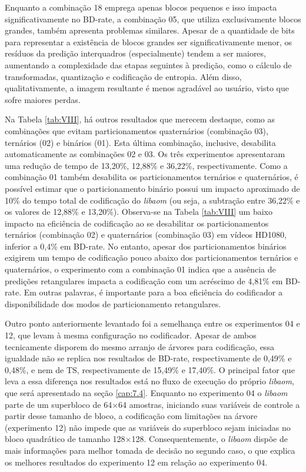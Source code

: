 Enquanto a combinação 18 emprega apenas blocos pequenos e isso impacta significativamente no BD-rate, a combinação 05, que utiliza exclusivamente blocos grandes, também apresenta problemas similares. Apesar de a quantidade de bits para representar a existência de blocos grandes ser significativamente menor, os resíduos da predição interquadros (especialmente) tendem a ser maiores, aumentando a complexidade das etapas seguintes à predição, como o cálculo de transformadas, quantização e codificação de entropia. Além disso, qualitativamente, a imagem resultante é menos agradável ao usuário, visto que sofre maiores perdas.

Na Tabela \ref{tab:VIII}, há outros resultados que merecem destaque, como as combinações que evitam particionamentos quaternários (combinação 03), ternários (02) e binários (01). Esta última combinação, inclusive, desabilita automaticamente as combinações 02 e 03. Os três experimentos apresentaram uma redução de tempo de 13,20\%, 12,88\% e 36,22\%, respectivamente. Como a combinação 01 também desabilita os particionamentos ternários e quaternários, é possível estimar que o particionamento binário possui um impacto aproximado de 10\% do tempo total de codificação do \textit{libaom} (ou seja, a subtração entre 36,22\% e os valores de 12,88\% e 13,20\%). Observa-se na Tabela \ref{tab:VIII} um baixo impacto na eficiência de codificação ao se desabilitar os particionamentos ternários (combinação 02) e quaternários (combinação 03) em vídeos HD1080, inferior a 0,4\% em BD-rate. No entanto, apesar dos particionamentos binários exigirem um tempo de codificação pouco abaixo dos particionamentos ternários e quaternários, o experimento com a combinação 01 indica que a ausência de predições retangulares impacta a codificação com um acréscimo de 4,81\% em BD-rate. Em outras palavras, é importante para a boa eficiência do codificador a disponibilidade dos modos de particionamento retangulares.

Outro ponto anteriormente levantado foi a semelhança entre os experimentos 04 e 12, que levam à mesma configuração no codificador. Apesar de ambos tecnicamente disporem do mesmo arranjo de árvores para codificação, essa igualdade não se replica nos resultados de BD-rate, respectivamente de 0,49\% e 0,48\%, e nem de TS, respectivamente de 15,49\% e 17,40\%. O principal fator que leva a essa diferença nos resultados está no fluxo de execução do próprio \textit{libaom}, que será apresentado na seção \ref{cap:7.4}. Enquanto no experimento 04 o \textit{libaom} parte de um superbloco de 64$\times$64 amostras, iniciando suas variáveis de controle a partir desse tamanho de bloco, a codificação com limitações na árvore (experimento 12) não impede que as variáveis do superbloco sejam iniciadas no bloco quadrático de tamanho 128$\times$128. Consequentemente, o \textit{libaom} dispõe de mais informações para melhor tomada de decisão no segundo caso, o que explica os melhores resultados do experimento 12 em relação ao experimento 04. 
